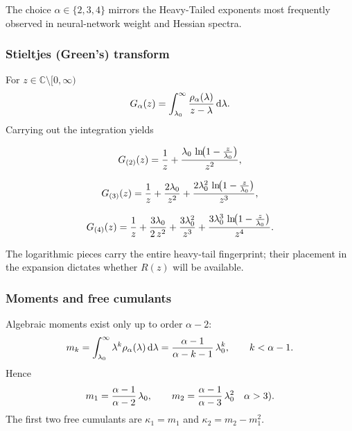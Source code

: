 The choice $\alpha\in\{2,3,4\}$ mirrors the Heavy-Tailed exponents most
frequently observed in neural-network weight and Hessian spectra.

\subsubsection{Stieltjes (Green’s) transform}
\label{sxn:RTransformExists:greens}

For $z\in\mathbb C\setminus[0,\infty)$
\begin{equation}
\label{eqn:RTransformExists_Gbare_def}
G_{\alpha}(z)=
\int_{\lambda_{0}}^{\infty}
\frac{\rho_{\alpha}(\lambda)}{z-\lambda}\,
\mathrm d\lambda .
\end{equation}
Carrying out the integration yields

\begin{equation}
\label{eqn:RTransformExists_G2}
G_{(2)}(z)=
\frac{1}{z}+
\frac{\lambda_{0}\,\ln\!\bigl(1-\frac{z}{\lambda_{0}}\bigr)}{z^{2}},
\end{equation}

\begin{equation}
\label{eqn:RTransformExists_G3}
G_{(3)}(z)=
\frac{1}{z}+
\frac{2\lambda_{0}}{z^{2}}+
\frac{2\lambda_{0}^{2}\,
      \ln\!\bigl(1-\frac{z}{\lambda_{0}}\bigr)}{z^{3}},
\end{equation}

\begin{equation}
\label{eqn:RTransformExists_G4}
G_{(4)}(z)=
\frac{1}{z}+
\frac{3\lambda_{0}}{2\,z^{2}}+
\frac{3\lambda_{0}^{2}}{z^{3}}+
\frac{3\lambda_{0}^{3}\,
      \ln\!\bigl(1-\frac{z}{\lambda_{0}}\bigr)}{z^{4}}.
\end{equation}

The logarithmic pieces carry the entire heavy-tail fingerprint; their
placement in the expansion dictates whether $R(z)$ will be available.

\subsubsection{Moments and free cumulants}
\label{sxn:RTransformExists:moments}

Algebraic moments exist only up to order $\alpha-2$:
\begin{equation}
\label{eqn:RTransformExists_mk}
m_{k}=
\int_{\lambda_0}^{\infty}\lambda^{k}\rho_{\alpha}(\lambda)\,
      \mathrm d\lambda
=
\frac{\alpha-1}{\alpha-k-1}\,
\lambda_{0}^{k},
\qquad
k<\alpha-1 .
\end{equation}
Hence
\begin{equation}
\label{eqn:RTransformExists_m1m2}
m_{1}=\frac{\alpha-1}{\alpha-2}\,\lambda_{0},
\qquad
m_{2}=\frac{\alpha-1}{\alpha-3}\,\lambda_{0}^{2}
\quad\alpha>3).
\end{equation}
The first two free cumulants are $\kappa_{1}=m_{1}$ and
$\kappa_{2}=m_{2}-m_{1}^{2}$.

